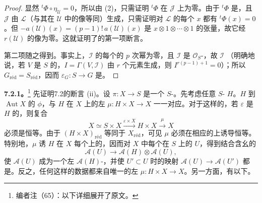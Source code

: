 \begin{proof}
显然 ${}^t\Phi\circ\eta_{\mathcal U}=0$，所以由 (2)，只需证明 ${}^t\Phi$ 在 $\mathcal J$ 上为零。由于 ${}^t\Phi$ 是，且 $\mathcal J$ 由 $\mathcal L$（与其在 $\mathcal U$ 中的像等同）生成，只需证明对 $\mathcal L$ 的每个 $x$ 都有 ${}^t\Phi(x)=0$。但 $-a(\mathcal U)(x)=(p-1)!\,a(\mathcal U)(x)$ 是 $x\otimes1\otimes\cdots\otimes1$ 的张量，故它经 $r(\mathcal U)$ 的像为零。这就证明了的第一项断言。

第二项随之得到。事实上，$\mathcal I$ 的每个的 $p$ 次幂为零，且 $\mathcal I$ 是 $\mathcal O_S$-，故 $\mathcal I$ （明确地说，若 $V$ 是 $S$ 的，$I=\Gamma(V,\mathcal I)$ 由 $r$ 个元素生成，则 $I^{r(p-1)+1}=0$）；所以 $G_{\mathrm{r\text{é}d}}=S_{\mathrm{r\text{é}d}}$，因而 $\varepsilon_G:S\to G$ 是。
\end{proof}

\textbf{7.2.1。}\footnote{编者注（65）：以下详细展开了原文。}
先证明7.2的断言 (ii)。设 $\pi:X\to S$ 是一个 $S$-。先考虑任意 $S$- $H$。$H$ 到 $\operatorname{Aut}X$ 的 $\phi$，与 $H$ 在 $X$ 上的左 $\mu:H\times X\to X$ 一一对应。对于这样的，若 $\varepsilon$ 是 $H$ 的，则复合
\[
 X\simeq S\times X\xrightarrow{\varepsilon\times X}H\times X\xrightarrow{\mu}X
\]
必须是恒等。由于 $(H\times X)_{\mathrm{r\text{é}d}}$ 等同于 $X_{\mathrm{r\text{é}d}}$，可见 $\mu$ 必须在相应的上诱导恒等。特别地，$\mu$ 诱 $H$ 在 $X$ 每个上的，因而对 $X$ 中每个在 $S$ 上的 $U$，得到结合含幺的
\[
 \mathcal A(U)\longrightarrow\mathcal A(H)\otimes\mathcal A(U),
\]
使 $\mathcal A(U)$ 成为一个左 $\mathcal A(H)$-，并使 $U'\subset U$ 时的映射 $\mathcal A(U)\to\mathcal A(U')$ 都是。反之，任何这样的数据都来自唯一的左 $\mu:H\times X\to X$。另一方面，有以下。

